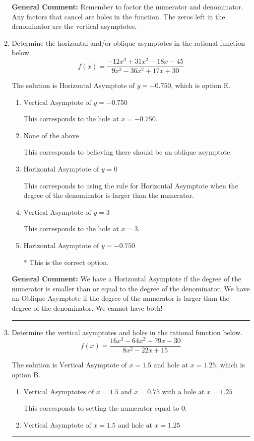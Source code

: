 \documentclass{extbook}[14pt]
\newcommand{\litem}[1]{\item #1

\rule{\textwidth}{0.4pt}}
\begin{document}
\begin{enumerate}
{\textbf{General Comment:} Remember to factor the numerator and denominator. Any factors that cancel are holes in the function. The zeros left in the denominator are the vertical asymptotes.
}
\litem{
Determine the horizontal and/or oblique asymptotes in the rational function below.
\[ f(x) = \frac{-12x^{3} +31 x^{2} -18 x -45}{9x^{3} -36 x^{2} +17 x + 30} \]

The solution is \( \text{Horizontal Asymptote of } y = -0.750  \), which is option E.\begin{enumerate}[label=\Alph*.]
\item \( \text{Vertical Asymptote of } y = -0.750  \)

This corresponds to the hole at $x = -0.750$.
\item \( \text{None of the above} \)

This corresponds to believing there should be an oblique asymptote.
\item \( \text{Horizontal Asymptote of } y = 0  \)

This corresponds to using the rule for Horizontal Asymptote when the degree of the denominator is larger than the numerator.
\item \( \text{Vertical Asymptote of } y = 3  \)

This corresponds to the hole at $x = 3$.
\item \( \text{Horizontal Asymptote of } y = -0.750  \)

* This is the correct option.
\end{enumerate}

\textbf{General Comment:} We have a Horizontal Asymptote if the degree of the numerator is smaller than or equal to the degree of the denominator. We have an Oblique Asymptote if the degree of the numerator is larger than the degree of the denominator. We cannot have both!
}
\litem{
Determine the vertical asymptotes and holes in the rational function below.
\[ f(x) = \frac{16x^{3} -64 x^{2} +79 x -30}{8x^{2} -22 x + 15} \]

The solution is \( \text{Vertical Asymptote of } x = 1.5 \text{ and hole at } x = 1.25 \), which is option B.\begin{enumerate}[label=\Alph*.]
\item \( \text{Vertical Asymptotes of } x = 1.5 \text{ and } x = 0.75 \text{ with a hole at } x = 1.25 \)

This corresponds to setting the numerator equal to 0.
\item \( \text{Vertical Asymptote of } x = 1.5 \text{ and hole at } x = 1.25 \)


\end{enumerate}}
\end{enumerate}
\end{document}
